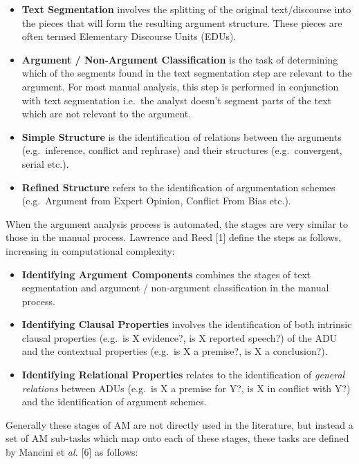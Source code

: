 \documentclass[twocolumn]{article}
\providecommand{\tightlist}{%
  \setlength{\itemsep}{0pt}\setlength{\parskip}{0pt}}
\begin{document}
\begin{itemize}
\tightlist
\item
  \textbf{Text Segmentation} involves the splitting of the original
  text/discourse into the pieces that will form the resulting argument
  structure. These pieces are often termed Elementary Discourse Units
  (EDUs).
\item
  \textbf{Argument / Non-Argument Classification} is the task of
  determining which of the segments found in the text segmentation step
  are relevant to the argument. For most manual analysis, this step is
  performed in conjunction with text segmentation i.e.~the analyst
  doesn't segment parts of the text which are not relevant to the
  argument.
\item
  \textbf{Simple Structure} is the identification of relations between
  the arguments (e.g.~inference, conflict and rephrase) and their
  structures (e.g.~convergent, serial etc.).
\item
  \textbf{Refined Structure} refers to the identification of
  argumentation schemes (e.g.~Argument from Expert Opinion, Conflict
  From Bias etc.).
\end{itemize}

When the argument analysis process is automated, the stages are very
similar to those in the manual process. Lawrence and Reed {[}1{]} define
the steps as follows, increasing in computational complexity:

\begin{itemize}
\tightlist
\item
  \textbf{Identifying Argument Components} combines the stages of text
  segmentation and argument / non-argument classification in the manual
  process.
\item
  \textbf{Identifying Clausal Properties} involves the identification of
  both intrinsic clausal properties (e.g.~is X evidence?, is X reported
  speech?) of the ADU and the contextual properties (e.g.~is X a
  premise?, is X a conclusion?).
\item
  \textbf{Identifying Relational Properties} relates to the
  identification of \emph{general relations} between ADUs (e.g.~is X a
  premise for Y?, is X in conflict with Y?) and the identification of
  argument schemes.
\end{itemize}

Generally these stages of AM are not directly used in the literature,
but instead a set of AM sub-tasks which map onto each of these stages,
these tasks are defined by Mancini et \emph{al.} {[}6{]} as follows:
\end{document}
